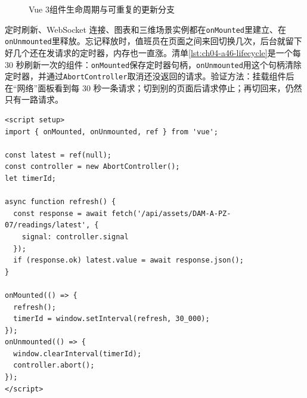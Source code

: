\begin{figure}[htbp]
\centering
{}
\caption{Vue 3组件生命周期与可重复的更新分支}
\label{fig:vue-lifecycle}
\end{figure}

定时刷新、WebSocket 连接、图表和三维场景实例都在\texttt{onMounted}里建立、在\texttt{onUnmounted}里释放。忘记释放时，值班员在页面之间来回切换几次，后台就留下好几个还在发请求的定时器，内存也一直涨。清单\ref{lst:ch04-a46-lifecycle}是一个每 30 秒刷新一次的组件：\texttt{onMounted}保存定时器句柄，\texttt{onUnmounted}用这个句柄清除定时器，并通过\texttt{AbortController}取消还没返回的请求。验证方法：挂载组件后在“网络”面板看到每 30 秒一条请求；切到别的页面后请求停止；再切回来，仍然只有一路请求。

\begin{lstlisting}[label={lst:ch04-a46-lifecycle},language=Vue,caption={onMounted 与 onUnmounted 的清理模式}]
<script setup>
import { onMounted, onUnmounted, ref } from 'vue';

const latest = ref(null);
const controller = new AbortController();
let timerId;

async function refresh() {
  const response = await fetch('/api/assets/DAM-A-PZ-07/readings/latest', {
    signal: controller.signal
  });
  if (response.ok) latest.value = await response.json();
}

onMounted(() => {
  refresh();
  timerId = window.setInterval(refresh, 30_000);
});
onUnmounted(() => {
  window.clearInterval(timerId);
  controller.abort();
});
</script>
\end{lstlisting}

